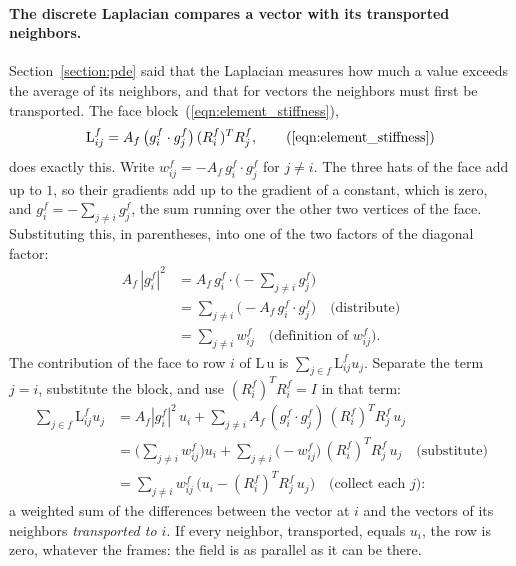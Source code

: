 \paragraph{The discrete Laplacian compares a vector with its transported neighbors.} Section~\ref{section:pde} said that the Laplacian measures how much a value exceeds the average of its neighbors, and that for vectors the neighbors must first be transported. The face block~(\ref{eqn:element_stiffness}),
\begin{equation*}
\mathrm L^f_{ij} = A_f\, \big( g_i^f \cdot g_j^f \big)\, (R_i^f)^T R_j^f , \tag{\ref{eqn:element_stiffness}}
\end{equation*}
does exactly this. Write $w_{ij}^f = -A_f\, g_i^f\cdot g_j^f$ for $j \neq i$. The three hats of the face add up to $1$, so their gradients add up to the gradient of a constant, which is zero, and $g_i^f = -\sum_{j \neq i} g_j^f$, the sum running over the other two vertices of the face. Substituting this, in parentheses, into one of the two factors of the diagonal factor:
\begin{align*}
A_f\, |g_i^f|^2 &= A_f\, g_i^f\cdot\Big(-\sum_{j\neq i} g_j^f\Big) \\
&= \sum_{j\neq i} \big(-A_f\, g_i^f\cdot g_j^f\big) \quad \text{(distribute)}\\
&= \sum_{j\neq i} w_{ij}^f \quad \text{(definition of $w_{ij}^f$)} .
\end{align*}
The contribution of the face to row $i$ of $\mathrm L\,\mathrm u$ is $\sum_{j\in f} \mathrm L^f_{ij} u_j$. Separate the term $j = i$, substitute the block, and use $(R_i^f)^TR_i^f = I$ in that term:
\begin{align*}
\sum_{j\in f} \mathrm L^f_{ij} u_j &= A_f |g_i^f|^2\, u_i + \sum_{j \neq i} A_f\, (g_i^f\cdot g_j^f)\, (R_i^f)^T R_j^f\, u_j \\
&= \Big(\sum_{j\neq i} w_{ij}^f\Big) u_i + \sum_{j\neq i} \big(-w_{ij}^f\big)\, (R_i^f)^T R_j^f\, u_j \quad \text{(substitute)}\\
&= \sum_{j\neq i} w_{ij}^f\, \big( u_i - (R_i^f)^T R_j^f\, u_j \big) \quad \text{(collect each $j$)} :
\end{align*}
a weighted sum of the differences between the vector at $i$ and the vectors of its neighbors \emph{transported to $i$}. If every neighbor, transported, equals $u_i$, the row is zero, whatever the frames: the field is as parallel as it can be there.

